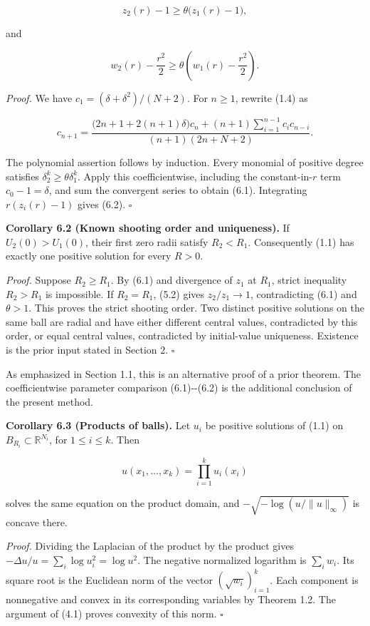 \documentclass[11pt]{article}
\begin{document}
\[
z_2(r)-1\geq\theta\bigl(z_1(r)-1\bigr),
\tag{6.1}
\]

and

\[
w_2(r)-\frac{r^2}{2}
\geq\theta\left(w_1(r)-\frac{r^2}{2}\right).
\tag{6.2}
\]

\emph{Proof.} We have \(c_1=(\delta+\delta^2)/(N+2)\). For \(n\geq1\),
rewrite (1.4) as

\[
c_{n+1}=
\frac{\bigl(2n+1+2(n+1)\delta\bigr)c_n
+(n+1)\displaystyle\sum_{i=1}^{n-1}c_ic_{n-i}}
{(n+1)(2n+N+2)}.
\tag{6.3}
\]

The polynomial assertion follows by induction. Every monomial of
positive degree satisfies \(\delta_2^k\geq\theta\delta_1^k\). Apply this
coefficientwise, including the constant-in-\(r\) term \(c_0-1=\delta\),
and sum the convergent series to obtain (6.1). Integrating
\(r(z_i(r)-1)\) gives (6.2). \(\square\)

\textbf{Corollary 6.2 (Known shooting order and uniqueness).} If
\(U_2(0)>U_1(0)\), their first zero radii satisfy \(R_2<R_1\).
Consequently (1.1) has exactly one positive solution for every \(R>0\).

\emph{Proof.} Suppose \(R_2\geq R_1\). By (6.1) and divergence of
\(z_1\) at \(R_1\), strict inequality \(R_2>R_1\) is impossible. If
\(R_2=R_1\), (5.2) gives \(z_2/z_1\to1\), contradicting (6.1) and
\(\theta>1\). This proves the strict shooting order. Two distinct
positive solutions on the same ball are radial and have either different
central values, contradicted by this order, or equal central values,
contradicted by initial-value uniqueness. Existence is the prior input
stated in Section 2. \(\square\)

As emphasized in Section 1.1, this is an alternative proof of a prior
theorem. The coefficientwise parameter comparison (6.1)-\/-(6.2) is the
additional conclusion of the present method.

\textbf{Corollary 6.3 (Products of balls).} Let \(u_i\) be positive
solutions of (1.1) on \(B_{R_i}\subset\mathbb R^{N_i}\), for
\(1\leq i\leq k\). Then

\[
u(x_1,\ldots,x_k)=\prod_{i=1}^k u_i(x_i)
\tag{6.4}
\]

solves the same equation on the product domain, and
\(-\sqrt{-\log(u/\|u\|_\infty)}\) is concave there.

\emph{Proof.} Dividing the Laplacian of the product by the product gives
\(-\Delta u/u=\sum_i\log u_i^2=\log u^2\). The negative normalized
logarithm is \(\sum_i w_i\). Its square root is the Euclidean norm of
the vector \((\sqrt{w_i})_{i=1}^k\). Each component is nonnegative and
convex in its corresponding variables by Theorem 1.2. The argument of
(4.1) proves convexity of this norm. \(\square\)
\end{document}
